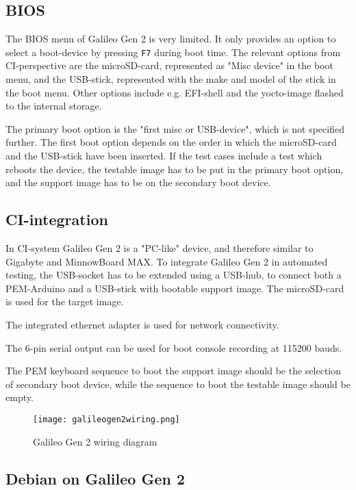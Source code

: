 \documentclass[a4paper,11pt]{article}
\newcommand{\cmd}[1]{\texttt{#1}}
\begin{document}
\subsection{BIOS}
The BIOS menu of Galileo Gen 2 is very limited. It only provides an option to select a boot-device by pressing \cmd{F7} during boot time. The relevant options from CI-perspective are the microSD-card, represented as "Misc device" in the boot menu, and the USB-stick, represented with the make and model of the stick in the boot menu. Other options include e.g. EFI-shell and the yocto-image flashed to the internal storage.

The primary boot option is the "first misc or USB-device", which is not specified further. The first boot option depends on the order in which the microSD-card and the USB-stick have been inserted. If the test cases include a test which reboots the device, the testable image has to be put in the primary boot option, and the support image has to be on the secondary boot device.

\subsection{CI-integration}

In CI-system Galileo Gen 2 is a "PC-like" device, and therefore similar to  Gigabyte and MinnowBoard MAX. To integrate Galileo Gen 2 in automated testing, the USB-socket has to be extended using a USB-hub, to connect both a PEM-Arduino and a USB-stick with bootable support image. The microSD-card is used for the target image.

The integrated ethernet adapter is used for network connectivity.

The 6-pin serial output can be used for boot console recording at 115200 bauds.

The PEM keyboard sequence to boot the support image should be the selection of secondary boot device, while the sequence to boot the testable image should be empty.

\begin{figure}[h]
	\centering
	\texttt{[image: galileogen2wiring.png]}
	\caption{Galileo Gen 2 wiring diagram}
	\label{fig:galileogen2wiring}
\end{figure}

\subsection{Debian on Galileo Gen 2}
\end{document}
